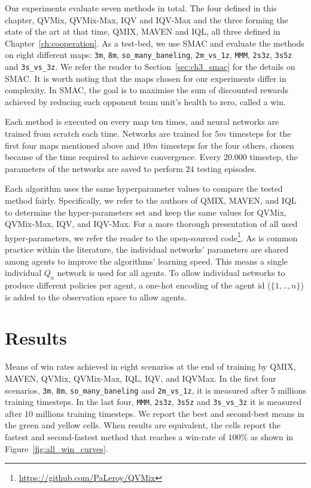 Our experiments evaluate seven methods in total.
The four defined in this chapter, QVMix, QVMix-Max, IQV and IQV-Max and the three forming the state of the art at that time, QMIX, MAVEN and IQL, all three defined in Chapter~\ref{ch:cooperation}.
As a test-bed, we use SMAC and evaluate the methods on eight different maps: \texttt{3m}, \texttt{8m}, \texttt{so\_many\_baneling}, \texttt{2m\_vs\_1z}, \texttt{MMM}, \texttt{2s3z}, \texttt{3s5z} and \texttt{3s\_vs\_3z}. 
We refer the reader to Section~\ref{sec:ch3_smac} for the details on SMAC.
It is worth noting that the maps chosen for our experiments differ in complexity. 
In SMAC, the goal is to maximise the sum of discounted rewards achieved by reducing each opponent team unit's health to zero, called a win.

Each method is executed on every map ten times, and neural networks are trained from scratch each time.
Networks are trained for $5m$ timesteps for the first four maps mentioned above and $10m$ timesteps for the four others, chosen because of the time required to achieve convergence.
Every $20.000$ timestep, the parameters of the networks are saved to perform $24$ testing episodes.

Each algorithm uses the same hyperparameter values to compare the tested method fairly.
Specifically, we refer to the authors of QMIX, MAVEN, and IQL to determine the hyper-parameters set and keep the same values for QVMix, QVMix-Max, IQV, and IQV-Max. 
For a more thorough presentation of all used hyper-parameters, we refer the reader to the open-sourced code\footnote{\url{https://github.com/PaLeroy/QVMix}}.
As is common practice within the literature, the individual networks' parameters are shared among agents to improve the algorithms' learning speed.
This means a single individual $Q_a$ network is used for all agents.
To allow individual networks to produce different policies per agent, a one-hot encoding of the agent id ($\{1,..,n\}$) is added to the observation space to allow agents.

\section{Results} \label{sec:ch4_results}

\begin{table}
    \centering
    
    \caption{
    Means of win rates achieved in eight scenarios at the end of training by QMIX, MAVEN, QVMix, QVMix-Max, IQL, IQV, and IQVMax. 
    In the first four scenarios, \texttt{3m}, \texttt{8m}, \texttt{so\_many\_baneling} and \texttt{2m\_vs\_1z}, it is measured after $5$ millions training timesteps.
    In the last four, \texttt{MMM}, \texttt{2s3z}, \texttt{3s5z} and \texttt{3s\_vs\_3z} it is measured after $10$ millions training timesteps.
    We report the best and second-best means in the green and yellow cells. When results are equivalent, the cells report the fastest and second-fastest method that reaches a win-rate of $100\%$ as shown in Figure~\ref{fig:all_win_curves}.}
    \label{tab:main_results}
\end{table}

